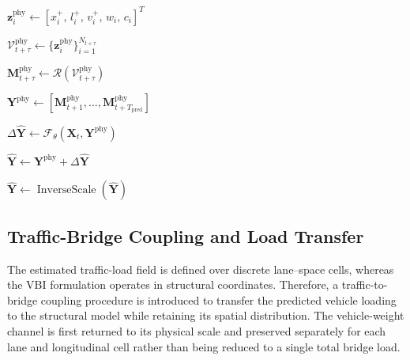 \documentclass[journal]{IEEEtran}
\begin{document}
\begin{algorithm}[!htbp]
{{        $\mathbf{z}_{i}^{\mathrm{phy}}
        \leftarrow
        [x_i^{+},\,l_i^{+},\,v_i^{+},\,w_i,\,c_i]^{T}$\;
    }

    $\mathcal{V}^{\mathrm{phy}}_{t+\tau}
    \leftarrow
    \{
    \mathbf{z}_{i}^{\mathrm{phy}}
    \}_{i=1}^{N_{t+\tau}}$\;

    $\mathbf{M}^{\mathrm{phy}}_{t+\tau}
    \leftarrow
    \mathcal{R}
    \left(
    \mathcal{V}^{\mathrm{phy}}_{t+\tau}
    \right)$\;
}

$\mathbf{Y}^{\mathrm{phy}}
\leftarrow
[
\mathbf{M}^{\mathrm{phy}}_{t+1},
\ldots,
\mathbf{M}^{\mathrm{phy}}_{t+T_{\mathrm{pred}}}
]$\;

$\Delta\widehat{\mathbf{Y}}
\leftarrow
\mathcal{F}_{\theta}
\left(
\mathbf{X}_{t},
\mathbf{Y}^{\mathrm{phy}}
\right)$\;

$\widehat{\mathbf{Y}}
\leftarrow
\mathbf{Y}^{\mathrm{phy}}
+
\Delta\widehat{\mathbf{Y}}$\;


$\widehat{\mathbf{Y}}
\leftarrow
\operatorname{InverseScale}
\left(
\widehat{\mathbf{Y}}
\right)$\;

\;

\end{algorithm}



\subsection{Traffic-Bridge Coupling and Load Transfer}
\label{sec:traffic_bridge_transfer}

The estimated traffic-load field is defined over discrete lane--space cells, whereas the VBI formulation operates in structural coordinates. Therefore, a traffic-to-bridge coupling procedure is introduced to transfer the predicted vehicle loading to the structural model while retaining its spatial distribution. The vehicle-weight channel is first returned to its physical scale and preserved separately for each lane and longitudinal cell rather than being reduced to a single total bridge load.
\end{document}
